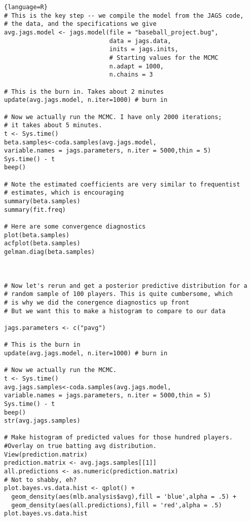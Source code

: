 \begin{lstlisting}{language=R}
# This is the key step -- we compile the model from the JAGS code, 
# the data, and the specifications we give
avg.jags.model <- jags.model(file = "baseball_project.bug", 
                             data = jags.data, 
                             inits = jags.inits, 
                             # Starting values for the MCMC
                             n.adapt = 1000, 
                             n.chains = 3 

# This is the burn in. Takes about 2 minutes
update(avg.jags.model, n.iter=1000) # burn in

# Now we actually run the MCMC. I have only 2000 iterations; 
# it takes about 5 minutes.
t <- Sys.time()
beta.samples<-coda.samples(avg.jags.model, 
variable.names = jags.parameters, n.iter = 5000,thin = 5)
Sys.time() - t
beep()

# Note the estimated coefficients are very similar to frequentist 
# estimates, which is encouraging
summary(beta.samples)
summary(fit.freq)

# Here are some convergence diagnostics
plot(beta.samples)
acfplot(beta.samples)
gelman.diag(beta.samples)



# Now let's rerun and get a posterior predictive distribution for a 
# random sample of 100 players. This is quite cumbersome, which 
# is why we did the conergence diagnostics up front
# But we want this to make a histogram to compare to our data

jags.parameters <- c("pavg") 

# This is the burn in
update(avg.jags.model, n.iter=1000) # burn in

# Now we actually run the MCMC. 
t <- Sys.time()
avg.jags.samples<-coda.samples(avg.jags.model, 
variable.names = jags.parameters, n.iter = 5000,thin = 5)
Sys.time() - t
beep()
str(avg.jags.samples)

# Make histogram of predicted values for those hundred players. 
#Overlay on true batting avg distribution.
View(prediction.matrix)
prediction.matrix <- avg.jags.samples[[1]]
all.predictions <- as.numeric(prediction.matrix)
# Not to shabby, eh?
plot.bayes.vs.data.hist <- qplot() + 
  geom_density(aes(mlb.analysis$avg),fill = 'blue',alpha = .5) +
  geom_density(aes(all.predictions),fill = 'red',alpha = .5)
plot.bayes.vs.data.hist
\end{lstlisting}
